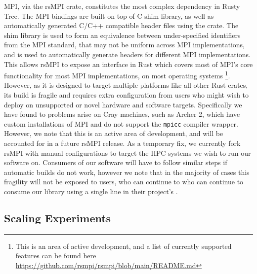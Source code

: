 MPI, via the rsMPI crate, constitutes the most complex dependency in Rusty Tree. The MPI bindings are built on top of C shim library, as well as automatically generated C/C++ compatible header files using the  crate. The shim library is used to form an equivalence between under-specified identifiers from the MPI standard, that may not be uniform across MPI implementations, and  is used to automatically generate headers for different MPI implementations. This allows rsMPI to expose an interface in Rust which covers most of MPI's core functionality for most MPI implementations, on most operating systems \footnote{This is an area of active development, and a list of currently supported features can be found here \url{https://github.com/rsmpi/rsmpi/blob/main/README.md}}. However, as it is designed to target multiple platforms like all other Rust crates, its build is fragile and requires extra configuration from users who might wish to deploy on unsupported or novel hardware and software targets. Specifically we have found to problems arise on Cray machines, such as Archer 2, which have custom installations of MPI and do not support the \texttt{mpicc} compiler wrapper. However, we note that this is an active area of development, and will be accounted for in a future rsMPI release. As a temporary fix, we currently fork rsMPI with manual configurations to target the HPC systems we wish to run our software on. Consumers of our software will have to follow similar steps if automatic builds do not work, however we note that in the majority of cases this fragility will not be exposed to users, who can continue to who can continue to consume our library using a single line in their project's . 

\subsection*{Scaling Experiments}

